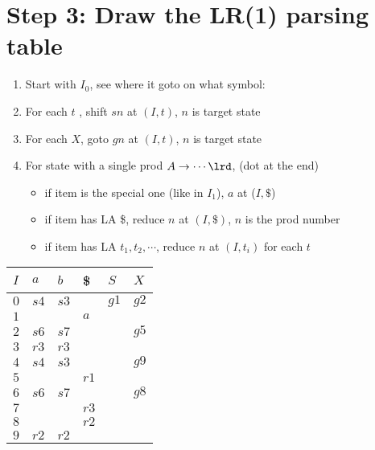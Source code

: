 \section*{Step 3: Draw the LR(1) parsing table}
\begin{enumerate}
\item Start with $I_0$, see where it goto on what symbol:
\item For each  $t$ , shift $sn$ at $(I,t)$,  $n$ is target state
\item For each  $X$, goto $gn$ at $(I,t)$, $n$ is target state
\item For state with a single prod $A\to \cdots \lrd$, (dot at the end)
  \begin{itemize}
  \item if item is the special one (like in $I_1$), $a$ at ($I, \$$)
  \item if item has LA \$, reduce $n$ at $(I, \$)$, $n$ is the prod number
  \item if item has LA $t_1,t_2,\cdots$, reduce $n$ at $(I, t_i)$ for each $t$
  \end{itemize}
\end{enumerate}
\begin{minipage}{.5\linewidth}
  \begin{tabular}{l|lll|ll}
    $I$ & $a$  & $b$  & \$  & $S$  & $X$ \\
    \hline
    $0$ & $s4$ & $s3$ &     & $g1$ & $g2$ \\
    $1$ &      &      & $a$ &      &      \\
    $2$ & $s6$ & $s7$ &     &      & $g5$ \\
    $3$ & $r3$ & $r3$ &   &   &  \\
    $4$ & $s4$  & $s3$  &   &   & $g9$ \\
    $5$ &   &   & $r1$  &   &  \\
    $6$ & $s6$  & $s7$  &   &   & $g8$ \\
    $7$ &   &   & $r3$  &   &  \\
    $8$ &   &   & $r2$  &   &  \\
    $9$ & $r2$  & $r2$   & &   &  \\
    \hline
  \end{tabular}
\end{minipage}
